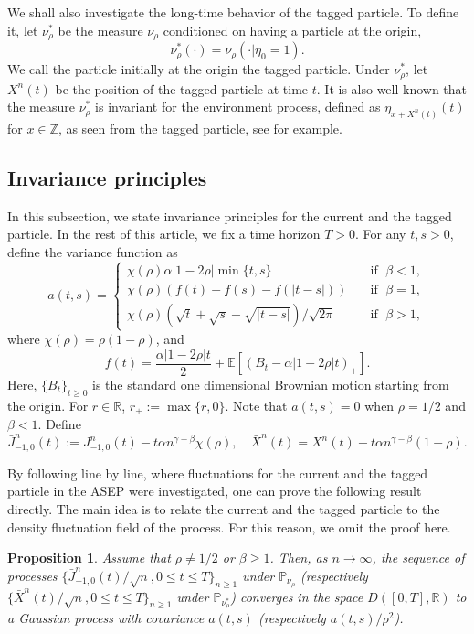 \documentclass[reqno,11pt]{amsart}
\numberwithin{equation}{section}
\newtheorem{proposition}[theorem]{Proposition}
\newcommand{\R}{\mathbb{R}}
\newcommand{\Z}{\mathbb{Z}}
\begin{document}
We shall also investigate the long-time behavior of the tagged particle. To define it, let $\nu_\rho^*$ be the measure $\nu_\rho$ conditioned on having a particle at the origin,
\[\nu_\rho^* (\cdot) = \nu_\rho (\cdot | \eta_0 = 1).\]
We call the particle initially at the origin the tagged particle. Under $\nu_\rho^*$, let $X^n (t)$ be the position of the tagged particle at time $t$. It is also well known that the measure $\nu_\rho^*$  is invariant for the environment process, defined as $\eta_{x + X^n (t)}(t)$ for $x \in \Z$,  as seen from the tagged particle, see \cite{liggettips} for example.

\subsection{Invariance principles} In this subsection, we state invariance principles for the current and the tagged particle.  In the rest of this article, we fix a time horizon $T > 0$. For any $t,s>0$, define the variance function as
\begin{equation}\label{a t s}
    a (t,s) = \begin{cases}
        \chi(\rho)\alpha|1-2\rho|\min\{t,s\} \quad &\text{if }\; \beta < 1,\\
        \chi(\rho)\left(f(t)+f(s)-f(|t-s|)\right) \quad &\text{if }\; \beta = 1,\\
        \chi(\rho)(\sqrt{t}+\sqrt{s}-\sqrt{|t-s|}) / \sqrt{2\pi}  \quad &\text{if }\; \beta > 1,
    \end{cases}
\end{equation}
 where $\chi (\rho) = \rho (1-\rho)$, and 
\[
f(t)=\frac{\alpha|1-2\rho|t}{2}+\mathbb{E}\left[\left(B_t-\alpha|1-2\rho|t\right)_+\right].
\]
Here, $\{B_t\}_{t\geq 0}$ is the standard one dimensional Brownian motion starting from the origin. For $r \in \R$, $r_+ := \max \{r,0\}$.  Note that $a (t,s) = 0$ when $\rho = 1/2$ and $\beta < 1$. Define
\[\bar{J}^n_{-1,0} (t) := J^n_{-1,0} (t) - t \alpha n^{\gamma-\beta}\chi (\rho), \quad \bar{X}^n (t) = X^n (t) - t \alpha n^{\gamma-\beta} (1-\rho).\]

By following \cite{gonccalves2008central} line by line, where fluctuations for the current and the tagged particle in the ASEP were investigated, one can prove the following result directly. The main idea is to relate the current and the tagged particle to the density fluctuation field of the process. For this reason, we omit the proof here.

\begin{proposition}\label{prop clt current tagged particle} Assume that $\rho \neq 1/2$ or $\beta \geq 1$. Then, as $n \rightarrow \infty$,  the sequence of processes $\{\bar{J}^n_{-1,0} (t)/\sqrt{n}, 0 \leq t \leq T \}_{n \geq 1}$ under $\mathbb{P}_{\nu_\rho}$ (respectively $\{\bar{X}^n (t)/\sqrt{n}, 0 \leq t \leq T \}_{n \geq 1}$ under $\mathbb{P}_{\nu_\rho^*}$) converges in the space $D([0,T],\R)$ to a Gaussian process with covariance $a(t,s)$ (respectively $a(t,s)/\rho^2$).
\end{proposition}
\end{document}
